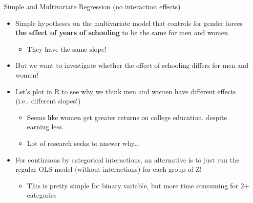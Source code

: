 \documentclass[8pt,ignorenonframetext,dvipsnames]{beamer}
\providecommand{\tightlist}{%
  \setlength{\itemsep}{0pt}\setlength{\parskip}{0pt}}
\renewcommand{\textbf}[1]{{\color{darkgray}\bfseries\fontfamily{Montserrat-TOsF}#1}}
\let\olditem\item
\renewcommand{\item}{%
  \olditem\vspace{4pt}
}
\begin{document}
\begin{frame}{Simple and Multivariate Regression (no interaction
effects)}
\protect\hypertarget{simple-and-multivariate-regression-no-interaction-effects}{}

\begin{itemize}
\tightlist
\item
  Simple hypotheses on the multivariate model that controls for gender
  forces \textbf{the effect of years of schooling} to be the same for
  men and women

  \begin{itemize}
  \tightlist
  \item
    They have the same slope!
  \end{itemize}
\item
  But we want to investigate whether the effect of schooling differs for
  men and women!
\item
  Let's plot in R to see why we think men and women have different
  effects (i.e., different slopes!)

  \begin{itemize}
  \tightlist
  \item
    Seems like women get greater returns on college education, despite
    earning less.
  \item
    Lot of research seeks to answer why\ldots{}
  \end{itemize}
\item
  For continuous by categorical interactions, an alternative is to just
  run the regular OLS model (without interactions) for each group of Z!

  \begin{itemize}
  \tightlist
  \item
    This is pretty simple for binary variable, but more time consuming
    for 2+ categories
  \end{itemize}
\end{itemize}

\end{frame}
\end{document}

